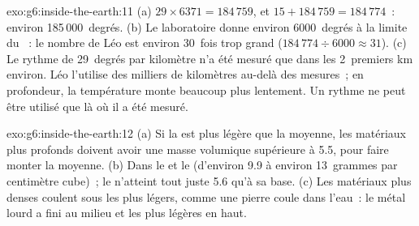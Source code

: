 \begin{solution}{exo:g6:inside-the-earth:11}
(a) $29 \times 6371 = 184\,759$, et $15 + 184\,759 = 184\,774$~: environ
185\,000~degrés. (b) Le laboratoire donne environ 6000~degrés à la limite
du ~: le nombre de Léo est environ 30~fois trop grand
($184\,774 \div 6000 \approx 31$). (c) Le rythme de 29~degrés par
kilomètre n'a été mesuré que dans les 2~premiers km environ. Léo l'utilise
des milliers de kilomètres au-delà des mesures~; en profondeur, la
température monte beaucoup plus lentement. Un rythme ne peut être utilisé
que là où il a été mesuré.
\end{solution}

\begin{solution}{exo:g6:inside-the-earth:12}
(a) Si la  est plus légère que la moyenne, les matériaux plus
profonds doivent avoir une masse volumique supérieure à 5.5, pour faire
monter la moyenne. (b) Dans le  et le  (d'environ
9.9 à environ 13~grammes par centimètre cube)~; le  n'atteint tout
juste 5.6 qu'à sa base. (c) Les matériaux plus denses coulent sous les
plus légers, comme une pierre coule dans l'eau~: le métal lourd a fini au
milieu et les  plus légères en haut.
\end{solution}

